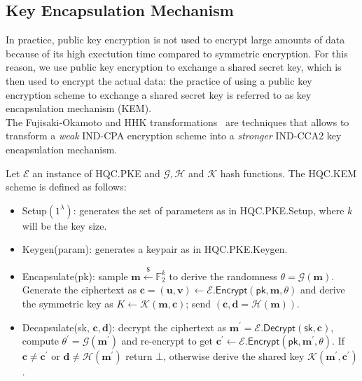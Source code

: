 \subsection{Key Encapsulation Mechanism}\label{sec:kem}
In practice, public key encryption is not used to encrypt large amounts of data because of its high exectution time compared to symmetric encryption.
For this reason, we use public key encryption to exchange a shared secret key, which is then used to encrypt the actual data: the practice
of using a public key encryption scheme to exchange a shared secret key is referred to as key encapsulation mechanism (KEM).\\
The Fujisaki-Okamoto and HHK transformations~\cite{DBLP:journals/joc/FujisakiO13, DBLP:conf/tcc/HofheinzHK17} are techniques that allows to transform a \textit{weak} IND-CPA encryption scheme
into a \textit{stronger} IND-CCA2 key encapsulation mechanism.

Let $\mathcal{E}$ an instance of \textsf{HQC.PKE} and $\mathcal{G, H}$ and $\mathcal{K}$ hash functions. The \textsf{HQC.KEM} scheme is defined as follows:
\begin{itemize}
    \item \textsf{Setup}$(1^\lambda)$: generates the set of parameters as in \textsf{HQC.PKE.Setup}, where $k$ will be the key size.
    \item \textsf{Keygen(param)}: generates a keypair as in \textsf{HQC.PKE.Keygen}.
    \item \textsf{Encapsulate(pk)}: sample $\mathbf{m} \xleftarrow{\mathdollar} \mathds{F}_2^k$ to derive the randomness $\theta = \mathcal{G}(\mathbf{m})$.
    Generate the ciphertext as $\mathbf{c} = (\mathbf{u, v}) \leftarrow \mathcal{E}.\textsf{Encrypt}(\textsf{pk}, \mathbf{m}, \theta)$ and derive the symmetric key
    as $K \leftarrow \mathcal{K}(\mathbf{m, c})$; send $(\mathbf{c, d} = \mathcal{H}(\mathbf{m})).$
    \item \textsf{Decapsulate}(\textsf{sk}, $\mathbf{c, d}$): decrypt the ciphertext as $\mathbf{m^\prime} = \mathcal{E}.\textsf{Decrypt}(\textsf{sk}, \mathbf{c})$, 
    compute $\theta^\prime = \mathcal{G}(\mathbf{m}^\prime)$ and re-encrypt to get $\mathbf{c^\prime} \leftarrow \mathcal{E}.\textsf{Encrypt}(\textsf{pk}, \mathbf{m^\prime}, \theta)$.
    If $\mathbf{c \neq c^\prime}$ or $\mathbf{d} \neq \mathcal{H}(\mathbf{m^\prime})$ return $\bot$, otherwise derive the shared key $\mathcal{K}(\mathbf{m^\prime, c^\prime})$.
\end{itemize}

